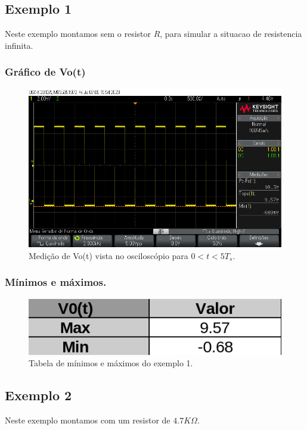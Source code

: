 \subsection{Exemplo 1}

Neste exemplo montamos sem o resistor $R$, para simular a situacao de resistencia infinita.

\subsubsection{Gráfico de Vo(t)}

\begin{figure}[H]
    \label{fig:ex1}
    \centering
    \includegraphics[width=0.7\columnwidth]{images/exemplo1.png}
    \caption{Medição de Vo(t) vista no osciloscópio para $0 < t < 5 T_s$.}
\end{figure}

\subsubsection{Mínimos e máximos.}

\begin{figure}[H]
    \label{fig:minmax_ex1}
    \centering
    \includegraphics[width=0.5\columnwidth]{images/minmax_ex1.png}
    \caption{Tabela de mínimos e máximos do exemplo 1.}
\end{figure}

\newpage

\subsection{Exemplo 2}

Neste exemplo montamos com um resistor  de $4.7K \Omega$.

